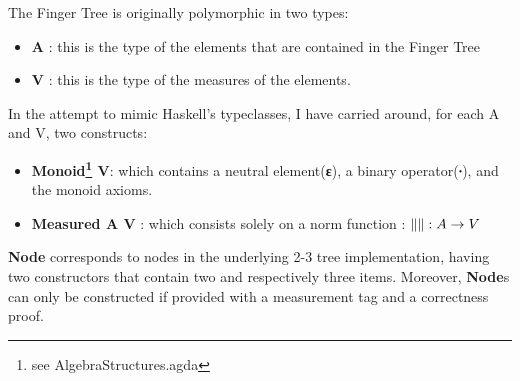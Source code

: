 \documentclass[12pt,twoside,notitlepage]{report}
\newcommand{\Conid}[1]{\mathit{#1}}
\newcommand{\Varid}[1]{\mathit{#1}}
\def\resethooks{%
  \global\let\SaveRestoreHook\empty
  \global\let\ColumnHook\empty}
\newcommand{\hsindent}[1]{\quad}%
\let\hspre\empty
\let\hspost\empty
\begin{document}
The Finger Tree is originally polymorphic in two types:
\begin{itemize}

\item \textbf{A} : this is the type of the elements that are contained in the Finger Tree 
\item \textbf{V} : this is the type of the measures of the elements. 

\end{itemize} 


In the attempt to mimic Haskell's typeclasses, I have carried around, for each A and V, two constructs:

\begin{itemize} 
\item \textbf{Monoid\footnote{see AlgebraStructures.agda} V}: which contains a neutral element(\textbf{ε}), a binary operator(\textbf{∙}), and the monoid axioms.
\item \textbf{Measured A V} : which consists solely on a norm function  :  \textbf{$\Vert \Vert : \nolinebreak A \rightarrow V$}
\end{itemize} 


\textbf{Node} corresponds to nodes in the underlying 2-3 tree implementation, having two constructors that contain two and respectively three items. Moreover, \textbf{Node}s can only be constructed if provided with a measurement tag and a correctness proof.
  
\resethooks
 
\end{document}
